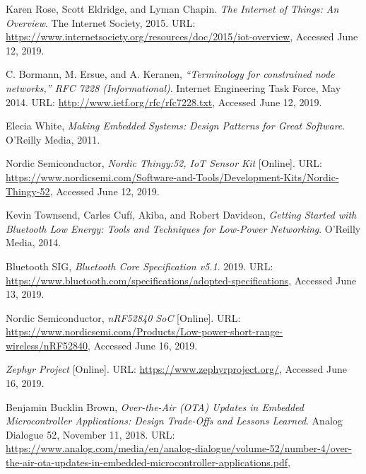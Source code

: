 \begin{thebibliography}{9}

        Karen Rose, Scott Eldridge, and Lyman Chapin.
        \textit{The Internet of Things: An Overview}.
        The Internet Society,
        2015.
        URL: \url{https://www.internetsociety.org/resources/doc/2015/iot-overview},
        Accessed June 12, 2019.

        C. Bormann, M. Ersue, and A. Keranen,
        \textit{“Terminology for constrained node networks,” RFC 7228 (Informational)}.
        Internet Engineering Task Force,
        May 2014.
        URL: \url{http://www.ietf.org/rfc/rfc7228.txt},
        Accessed June 12, 2019.

        Elecia White,
        \textit{Making Embedded Systems: Design Patterns for Great Software}.
        O'Reilly Media, 
        2011.

        Nordic Semiconductor,
        \textit{Nordic Thingy:52, IoT Sensor Kit} [Online].
        URL: \url{https://www.nordicsemi.com/Software-and-Tools/Development-Kits/Nordic-Thingy-52},
        Accessed June 12, 2019.

        Kevin Townsend, Carles Cufí, Akiba, and Robert Davidson,
        \textit{Getting Started with Bluetooth Low Energy: Tools and Techniques for Low-Power Networking}.
        O'Reilly Media, 
        2014.

        Bluetooth SIG,
        \textit{Bluetooth Core Specification v5.1}.
        2019.
        URL: \url{https://www.bluetooth.com/specifications/adopted-specifications},
        Accessed June 13, 2019.

        Nordic Semiconductor,
        \textit{nRF52840 SoC} [Online].
        URL: \url{https://www.nordicsemi.com/Products/Low-power-short-range-wireless/nRF52840},
        Accessed June 16, 2019.

        \textit{Zephyr Project} [Online].
        URL: \url{https://www.zephyrproject.org/},
        Accessed June 16, 2019.

        Benjamin Bucklin Brown,
        \textit{Over-the-Air (OTA) Updates in Embedded Microcontroller 
            Applications: Design Trade-Offs and Lessons Learned}.
        Analog Dialogue 52, 
        November 11, 2018.     
        URL: \url{https://www.analog.com/media/en/analog-dialogue/volume-52/number-4/over-the-air-ota-updates-in-embedded-microcontroller-applications.pdf},   
        
\end{thebibliography}